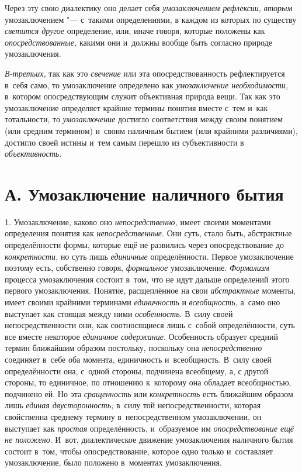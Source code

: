 Через эту свою диалектику оно делает себя
{\em умозаключением рефлексии,}
{\em вторым}
умозаключением "--- с~такими определениями, в
каждом из которых по существу
{\em светится другое}
определение, или, иначе говоря, которые положены как
{\em опосредствованные,}
какими они и~должны вообще быть согласно природе
умозаключения.

{\em В-третьих,} так как
это {\em свечение} или
эта опосредствованность рефлектируется в~себя само, то умозаключение
определено как {\em умозаключение
необходимости,} в~котором опосредствующим служит объективная
природа вещи. Так как это умозаключение определяет крайние термины понятия
вместе с~тем и~как тотальности, то
{\em умозаключение}
достигло соответствия между своим понятием (или средним
термином) и~своим наличным бытием (или крайними различиями), достигло своей
истины и~тем самым перешло из субъективности в
{\em объективность}.

\section[А. Умозаключение наличного бытия]{А. Умозаключение наличного бытия}

1. Умозаключение, каково оно
{\em непосредственно,}
имеет своими моментами определения понятия как
{\em непосредственные}.
Они суть, стало быть, абстрактные определённости формы,
которые ещё не развились через опосредствование до
{\em конкретности,} но
суть лишь {\em единичные}
определённости. Первое умозаключение поэтому есть,
собственно говоря,
{\em формальное}
умозаключение.
{\em Формализм} процесса
умозаключения состоит в~том, что не идут дальше определений этого первого
умозаключения. Понятие, расщеплённое на свои
{\em абстрактные}
моменты, имеет своими крайними терминами
{\em единичность} и
{\em всеобщность,} а~само
оно выступает как стоящая между ними
{\em особенность}. В~силу
своей непосредственности они, как соотносящиеся лишь с~собой
определённости, суть все вместе некоторое
{\em единичное содержание}.
Особенность образует средний термин ближайшим образом
постольку, поскольку она
{\em непосредственно}
соединяет в~себе оба момента, единичность и~всеобщность. В~силу своей
определённости она, с~одной стороны, подчинена всеобщему, а, с
другой стороны, то единичное, по отношению к~которому она обладает
всеобщностью, подчинено ей. Но эта {\em сращенность} или
{\em конкретность}
есть ближайшим образом лишь
{\em единая двусторонность;}
в~силу той непосредственности, которая свойственна среднему
термину в~непосредственном умозаключении, он выступает как
{\em простая}
определённость, и~образуемое им
{\em опосредствование ещё не положено}.
И~вот, диалектическое движение умозаключения наличного бытия
состоит в~том, чтобы опосредствование, которое одно только и~составляет
умозаключение, было положено в~моментах умозаключения.

